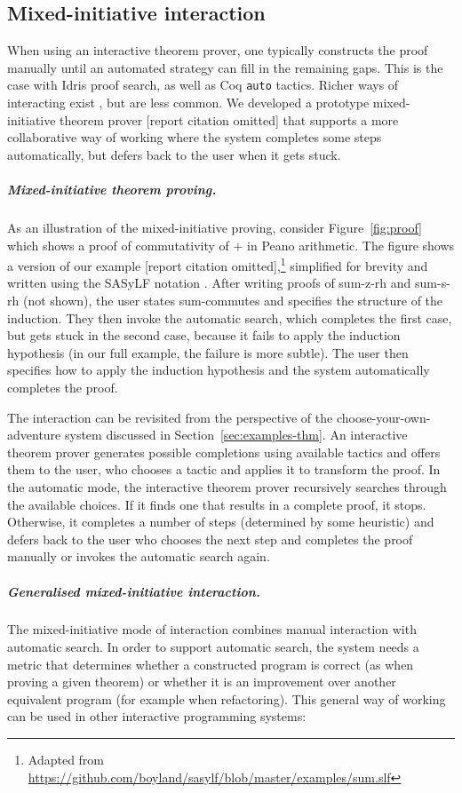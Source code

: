 \documentclass[a4paper,UKenglish,cleveref, autoref, thm-restate]{lipics-v2021}
\newcommand{\ident}[1]{\textsf{#1}}
\begin{document}
\subsection{Mixed-initiative interaction}
When using an interactive theorem prover, one typically constructs the proof manually until an
automated strategy can fill in the remaining gaps. This is the case with Idris proof search,
as well as Coq \texttt{auto} tactics. Richer ways of interacting exist \cite{lowe-1997-xbarnacle},
but are less common. We developed a prototype mixed-initiative theorem prover [report citation
omitted] that supports a more collaborative way of working where the system completes some
steps automatically, but defers back to the user when it gets stuck.

\subparagraph{Mixed-initiative theorem proving.}
As an illustration of the mixed-initiative proving, consider Figure~\ref{fig:proof} which
shows a proof of commutativity of $+$ in Peano arithmetic. The figure shows a version of our example
[report citation omitted],\footnote{Adapted from \url{https://github.com/boyland/sasylf/blob/master/examples/sum.slf}}
simplified for brevity and written using the SASyLF notation \cite{aldrich-2008-sasylf}.
After writing proofs of \ident{sum-z-rh} and \ident{sum-s-rh} (not shown), the user states
\ident{sum-commutes} and specifies the structure of the induction. They then invoke the automatic
search, which completes the first case, but gets stuck in the second case, because it fails
to apply the induction hypothesis (in our full example, the failure is more subtle). The user
then specifies how to apply the induction hypothesis and the system automatically completes the
proof.

The interaction can be revisited from the perspective of the choose-your-own-adventure system
discussed in Section~\ref{sec:examples-thm}. An interactive theorem prover generates possible
completions using available tactics and offers them to the user, who chooses a tactic and
applies it to transform the proof. In the automatic mode, the interactive theorem prover
recursively searches through the available choices. If it finds one that results in a complete
proof, it stops. Otherwise, it completes a number of steps (determined by some heuristic)
and defers back to the user who chooses the next step and completes the proof manually or
invokes the automatic search again.

\subparagraph{Generalised mixed-initiative interaction.}
The mixed-initiative mode of interaction combines manual interaction with automatic search.
In order to support automatic search, the system needs a metric that determines whether a
constructed program is correct (as when proving a given theorem) or whether it is an improvement
over another equivalent program (for example when refactoring). This general way of working
can be used in other interactive programming systems:
\end{document}
